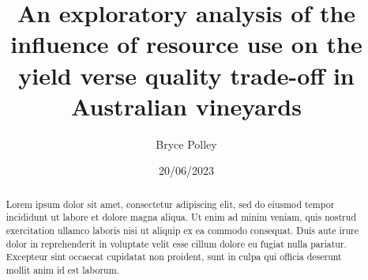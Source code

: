 \documentclass[review,12pt,authoryear]{elsarticle}
\begin{document}
\begin{linenumbers}
\begin{frontmatter}




    \title{An exploratory analysis of the influence of resource use on the yield verse quality trade-off in Australian vineyards}



\author[label1,label2,label3]{Bryce Polley}
\date{20/06/2023}

      


    \begin{abstract}
      Lorem ipsum dolor sit amet, consectetur adipiscing elit, sed do eiusmod tempor incididunt ut labore et dolore magna aliqua. Ut enim ad minim veniam, quis nostrud exercitation ullamco laboris nisi ut aliquip ex ea commodo consequat. Duis aute irure dolor in reprehenderit in voluptate velit esse cillum dolore eu fugiat nulla pariatur. Excepteur sint occaecat cupidatat non proident, sunt in culpa qui officia deserunt mollit anim id est laborum.
      \end{abstract}


\end{frontmatter}
\end{linenumbers}
\end{document}
